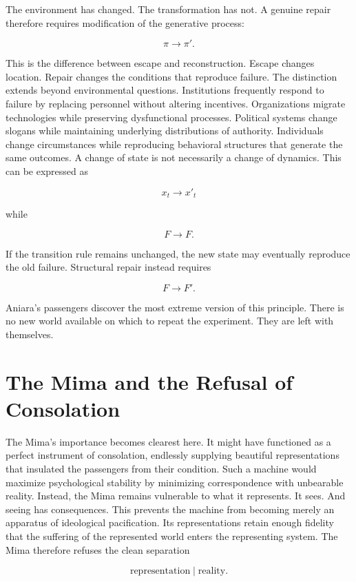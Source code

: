 \documentclass[11pt,oneside]{book}
\theoremstyle{definition}
\theoremstyle{remark}
\begin{document}
The environment has changed. The transformation has not. A genuine repair therefore requires
modification of the generative process:

\[
\pi\rightarrow\pi'.
\]

This is the difference between escape and reconstruction. Escape changes location. Repair changes
the conditions that reproduce failure. The distinction extends beyond environmental questions.
Institutions frequently respond to failure by replacing personnel without altering incentives.
Organizations migrate technologies while preserving dysfunctional processes. Political systems
change slogans while maintaining underlying distributions of authority. Individuals change
circumstances while reproducing behavioral structures that generate the same outcomes. A change of
state is not necessarily a change of dynamics. This can be expressed as

\[
x_t\rightarrow x'_t
\]

while

\[
F\rightarrow F.
\]

If the transition rule remains unchanged, the new state may eventually reproduce the old failure.
Structural repair instead requires

\[
F\rightarrow F'.
\]

Aniara's passengers discover the most extreme version of this principle. There is no new world
available on which to repeat the experiment. They are left with themselves.

\section*{The Mima and the Refusal of Consolation}

The Mima's importance becomes clearest here. It might have functioned as a perfect instrument of
consolation, endlessly supplying beautiful representations that insulated the passengers from their
condition. Such a machine would maximize psychological stability by minimizing correspondence with
unbearable reality. Instead, the Mima remains vulnerable to what it represents. It sees. And seeing
has consequences. This prevents the machine from becoming merely an apparatus of ideological
pacification. Its representations retain enough fidelity that the suffering of the represented world
enters the representing system. The Mima therefore refuses the clean separation

\[
\text{representation} \mid \text{reality}.
\]
\end{document}

